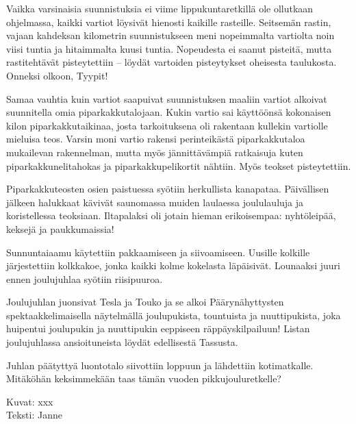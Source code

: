 \begin{multicols}{2}
Vaikka varsinaisia suunnistuksia ei viime lippukuntaretkillä ole ollutkaan 
ohjelmassa, kaikki vartiot löysivät hienosti kaikille rasteille. Seitsemän 
rastin, vajaan kahdeksan kilometrin suunnistukseen meni nopeimmalta vartiolta 
noin viisi tuntia ja hitaimmalta kuusi tuntia. Nopeudesta ei saanut pisteitä, 
mutta rastitehtävät pisteytettiin -- löydät vartoiden pisteytykset 
oheisesta taulukosta. Onneksi olkoon, Tyypit!

Samaa vauhtia kuin vartiot saapuivat suunnistuksen maaliin vartiot alkoivat 
suunnitella omia piparkakkutalojaan. Kukin vartio sai käyttöönsä kokonaisen 
kilon piparkakkutaikinaa, josta tarkoituksena oli rakentaan kullekin vartiolle 
mieluisa teos. Varsin moni vartio rakensi perinteikästä piparkakkutaloa 
mukailevan rakennelman, mutta myös jännittävämpiä ratkaisuja kuten 
piparkakkunelitahokas ja piparkakkupelikortit nähtiin. Myös teokset 
pisteytettiin.

Piparkakkuteosten osien paistuessa syötiin herkullista kanapataa. 
Päivällisen jälkeen halukkaat kävivät saunomassa muiden laulaessa 
joululauluja ja koristellessa teoksiaan. Iltapalaksi oli jotain hieman 
erikoisempaa: nyhtöleipää, keksejä ja paukkumaissia!

Sunnuntaiaamu käytettiin pakkaamiseen ja siivoamiseen. Uusille kolkille 
järjestettiin kolkkakoe, jonka kaikki kolme kokelasta läpäisivät. Lounaaksi 
juuri ennen joulujuhlaa syötiin riisipuuroa. 

Joulujuhlan juonsivat Tesla ja Touko ja se alkoi Päärynähyttysten 
spektaakkelimaisella näytelmällä joulupukista, tountuista ja nuuttipukista, 
joka huipentui joulupukin ja nuuttipukin eeppiseen räppäyskilpailuun! Listan 
joulujuhlassa ansioituneista löydät edellisestä Tassusta.

Juhlan päätyttyä luontotalo siivottiin loppuun ja lähdettiin kotimatkalle. 
Mitäköhän keksimmekään taas tämän vuoden pikkujouluretkelle?
\end{multicols}

\medskip

\noindent\null\hfill Kuvat: xxx\\
\noindent\null\hfill Teksti: Janne
